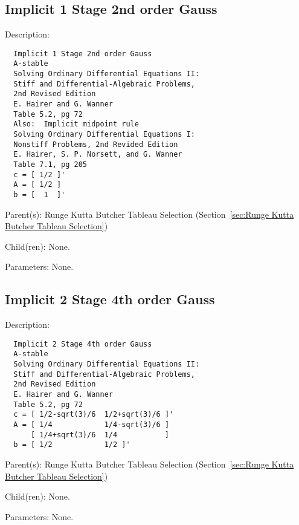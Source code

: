 \subsection{Implicit 1 Stage 2nd order Gauss}
\label{sec:Implicit 1 Stage 2nd order Gauss}

\begin{list}{}
  {\setlength{\leftmargin}{1.0in}
   \setlength{\labelwidth}{0.75in}
   \setlength{\labelsep}{0.125in}}
  \item[Description:]
\begin{verbatim}
  Implicit 1 Stage 2nd order Gauss
  A-stable
  Solving Ordinary Differential Equations II:
  Stiff and Differential-Algebraic Problems,
  2nd Revised Edition
  E. Hairer and G. Wanner
  Table 5.2, pg 72
  Also:  Implicit midpoint rule
  Solving Ordinary Differential Equations I:
  Nonstiff Problems, 2nd Revided Edition
  E. Hairer, S. P. Norsett, and G. Wanner
  Table 7.1, pg 205
  c = [ 1/2 ]'
  A = [ 1/2 ]
  b = [  1  ]'
\end{verbatim}
  \item[Parent(s):]
    Runge Kutta Butcher Tableau Selection (Section~\ref{sec:Runge Kutta Butcher Tableau Selection})
  \item[Child(ren):]
    None. 
  \item[Parameters:]
    None. 
\end{list}

\subsection{Implicit 2 Stage 4th order Gauss}
\label{sec:Implicit 2 Stage 4th order Gauss}

\begin{list}{}
  {\setlength{\leftmargin}{1.0in}
   \setlength{\labelwidth}{0.75in}
   \setlength{\labelsep}{0.125in}}
  \item[Description:]
\begin{verbatim}
  Implicit 2 Stage 4th order Gauss
  A-stable
  Solving Ordinary Differential Equations II:
  Stiff and Differential-Algebraic Problems,
  2nd Revised Edition
  E. Hairer and G. Wanner
  Table 5.2, pg 72
  c = [ 1/2-sqrt(3)/6  1/2+sqrt(3)/6 ]'
  A = [ 1/4            1/4-sqrt(3)/6 ]
      [ 1/4+sqrt(3)/6  1/4           ]
  b = [ 1/2            1/2 ]'
\end{verbatim}
  \item[Parent(s):]
    Runge Kutta Butcher Tableau Selection (Section~\ref{sec:Runge Kutta Butcher Tableau Selection})
  \item[Child(ren):]
    None. 
  \item[Parameters:]
    None. 
\end{list}


